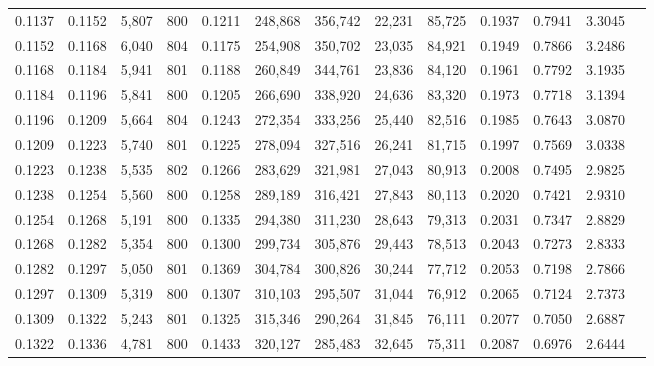 \begin{tabular}{rrrrrrrrrrrrr}
0.1137 & 0.1152 &  5,807 & 800 &                                     0.1211 & 248,868 & 356,742 &  22,231 &  85,725 & 0.1937 & 0.7941 & 3.3045 \\
0.1152 & 0.1168 &  6,040 & 804 &                                     0.1175 & 254,908 & 350,702 &  23,035 &  84,921 & 0.1949 & 0.7866 & 3.2486 \\
0.1168 & 0.1184 &  5,941 & 801 &                                     0.1188 & 260,849 & 344,761 &  23,836 &  84,120 & 0.1961 & 0.7792 & 3.1935 \\
0.1184 & 0.1196 &  5,841 & 800 &                                     0.1205 & 266,690 & 338,920 &  24,636 &  83,320 & 0.1973 & 0.7718 & 3.1394 \\
0.1196 & 0.1209 &  5,664 & 804 &                                     0.1243 & 272,354 & 333,256 &  25,440 &  82,516 & 0.1985 & 0.7643 & 3.0870 \\
0.1209 & 0.1223 &  5,740 & 801 &                                     0.1225 & 278,094 & 327,516 &  26,241 &  81,715 & 0.1997 & 0.7569 & 3.0338 \\
0.1223 & 0.1238 &  5,535 & 802 &                                     0.1266 & 283,629 & 321,981 &  27,043 &  80,913 & 0.2008 & 0.7495 & 2.9825 \\
0.1238 & 0.1254 &  5,560 & 800 &                                     0.1258 & 289,189 & 316,421 &  27,843 &  80,113 & 0.2020 & 0.7421 & 2.9310 \\
0.1254 & 0.1268 &  5,191 & 800 &                                     0.1335 & 294,380 & 311,230 &  28,643 &  79,313 & 0.2031 & 0.7347 & 2.8829 \\
0.1268 & 0.1282 &  5,354 & 800 &                                     0.1300 & 299,734 & 305,876 &  29,443 &  78,513 & 0.2043 & 0.7273 & 2.8333 \\
0.1282 & 0.1297 &  5,050 & 801 &                                     0.1369 & 304,784 & 300,826 &  30,244 &  77,712 & 0.2053 & 0.7198 & 2.7866 \\
0.1297 & 0.1309 &  5,319 & 800 &                                     0.1307 & 310,103 & 295,507 &  31,044 &  76,912 & 0.2065 & 0.7124 & 2.7373 \\
0.1309 & 0.1322 &  5,243 & 801 &                                     0.1325 & 315,346 & 290,264 &  31,845 &  76,111 & 0.2077 & 0.7050 & 2.6887 \\
0.1322 & 0.1336 &  4,781 & 800 &                                     0.1433 & 320,127 & 285,483 &  32,645 &  75,311 & 0.2087 & 0.6976 & 2.6444 \\

\end{tabular}
